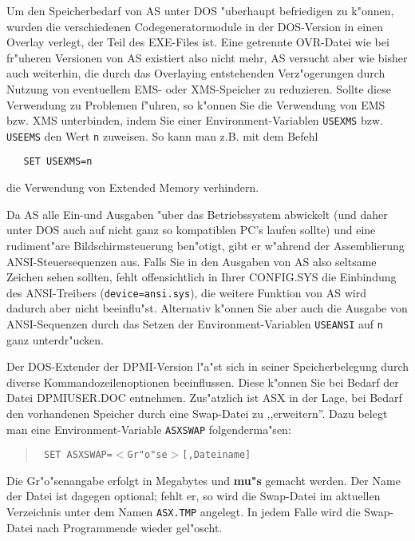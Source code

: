\documentclass[12pt,a4paper,twoside]{report}
\newcommand{\bb}[1]{{\bf #1}}
\newcommand{\tty}[1]{{\tt #1}}
\begin{document}
Um den  Speicherbedarf von AS unter DOS "uberhaupt
befriedigen zu k"onnen, wurden die verschiedenen Codegeneratormodule in
der DOS-Version in einen Overlay verlegt, der Teil des EXE-Files ist.
Eine getrennte OVR-Datei wie bei fr"uheren Versionen von AS existiert also
nicht mehr, AS versucht aber wie bisher auch weiterhin, die durch das
Overlaying entstehenden Verz"ogerungen durch Nutzung von eventuellem EMS-
oder XMS-Speicher zu reduzieren.  Sollte diese Verwendung zu Problemen
f"uhren, so k"onnen Sie die Verwendung von EMS bzw. XMS unterbinden, indem
Sie einer Environment-Variablen \tty{USEXMS} bzw. \tty{USEEMS} den Wert
\tty{n} zuweisen.  So kann man z.B. mit dem Befehl
\begin{verbatim}
   SET USEXMS=n
\end{verbatim}
die Verwendung von Extended Memory verhindern.
\par
Da AS alle Ein-und Ausgaben "uber das Betriebssystem abwickelt (und daher
unter DOS auch auf nicht ganz so kompatiblen PC's laufen sollte) und eine
rudiment"are Bildschirmsteuerung ben"otigt, gibt er w"ahrend der
Assemblierung ANSI-Steuersequenzen aus.
Falls Sie in den Ausgaben von AS  also seltsame
Zeichen sehen sollten, fehlt offensichtlich in Ihrer CONFIG.SYS die
Einbindung des ANSI-Trei\-bers (\tty{device=\-ansi.sys}), die weitere Funktion
von AS  wird dadurch aber nicht beeinflu"st. Alternativ
k"onnen Sie aber auch die Ausgabe von ANSI-Sequenzen durch das Setzen der
Environment-Variablen \tty{USEANSI} auf \tty{n} ganz unterdr"ucken.

Der DOS-Extender der DPMI-Version  l"a"st sich in
seiner Speicherbelegung durch diverse Kommandozeilenoptionen beeinflussen.
Diese k"onnen Sie bei Bedarf der Datei DPMIUSER.DOC entnehmen.
Zus"atzlich ist ASX in der Lage, bei Bedarf den vorhandenen Speicher
durch eine Swap-Datei zu ,,erweitern''.  Dazu belegt man eine
Environment-Variable \tty{ASXSWAP} folgenderma"sen:
\begin{quote}{\tt
  SET ASXSWAP=$<$Gr"o"se$>$[,Dateiname]
}\end{quote}
Die Gr"o"senangabe erfolgt in Megabytes und \bb{mu"s} gemacht werden.  Der
Name der Datei ist dagegen optional; fehlt er, so wird die Swap-Datei im
aktuellen Verzeichnis unter dem Namen \tty{ASX.TMP} angelegt.  In jedem
Falle wird die Swap-Datei nach Programmende wieder gel"oscht.
\end{document}
